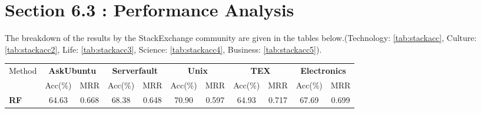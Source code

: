 \documentclass[smallcondensed]{svjour3}     %
\begin{document}
\section{Section 6.3 : Performance Analysis}
The breakdown of the results by the StackExchange community are given in the tables below.(Technology: \cref{tab:stackacc}, Culture: \cref{tab:stackacc2}, Life: \cref{tab:stackacc3}, Science: \cref{tab:stackacc4}, Business: \cref{tab:stackacc5}).
\begin{table}[h]
  \centering
 \begin{subtable}{\textwidth}
  \begin{tabular}{l|c c|c c|c c|c c|c c}
     \toprule
     \multirow{2}{*}{Method} &
        \multicolumn{2}{c}{\textbf{AskUbuntu}} &
       \multicolumn{2}{c}{\textbf{Serverfault}} &
       \multicolumn{2}{c}{\textbf{Unix}} &
       \multicolumn{2}{c}{\textbf{TEX}} &
       \multicolumn{2}{c}{\textbf{Electronics}}\\
       &{Acc(\%)} & {MRR}&{Acc(\%)} & {MRR}&{Acc(\%)}& {MRR}&{Acc(\%)} & {MRR}&{Acc(\%)} & {MRR}\\
       \midrule
     \textbf{RF~\cite{BurelMA16,TianZL13}} & 64.63 & 0.668 & 68.38 & 0.648 & 70.90 & 0.597 & 64.93 & 0.717 & 67.69 & 0.699\\



\end{tabular}
\end{subtable}
\end{table}
\end{document}
